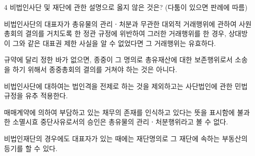 \begin{question}{4}
비법인사단 및 재단에 관한 설명으로 옳지 않은 것은? (다툼이 있으면 판례에 따름)
\begin{choices}
  \item 비법인사단의 대표자가 총유물의 관리ㆍ처분과 무관한 대외적 거래행위에 관하여 사원총회의 결의를 거치도록 한 정관 규정에 위반하여 그러한 거래행위를 한 경우, 상대방이 그와 같은 대표권 제한 사실을 알 수 없었다면 그 거래행위는 유효하다.
  \item 규약에 달리 정한 바가 없으면, 종중이 그 명의로 총유재산에 대한 보존행위로서 소송을 하기 위해서 종중총회의 결의를 거쳐야 하는 것은 아니다.
  \item 비법인사단에 대하여는 법인격을 전제로 하는 것을 제외하고는 사단법인에 관한 민법규정을 유추 적용한다.
  \item 매매계약에 의하여 부담하고 있는 채무의 존재를 인식하고 있다는 뜻을 표시함에 불과한 소멸시효 중단사유로서의 승인은 총유물의 관리ㆍ처분행위라고 볼 수 없다.
  \item 비법인재단의 경우에도 대표자가 있는 때에는 재단명의로 그 재단에 속하는 부동산의 등기를 할 수 있다.
\end{choices}
\end{question}
